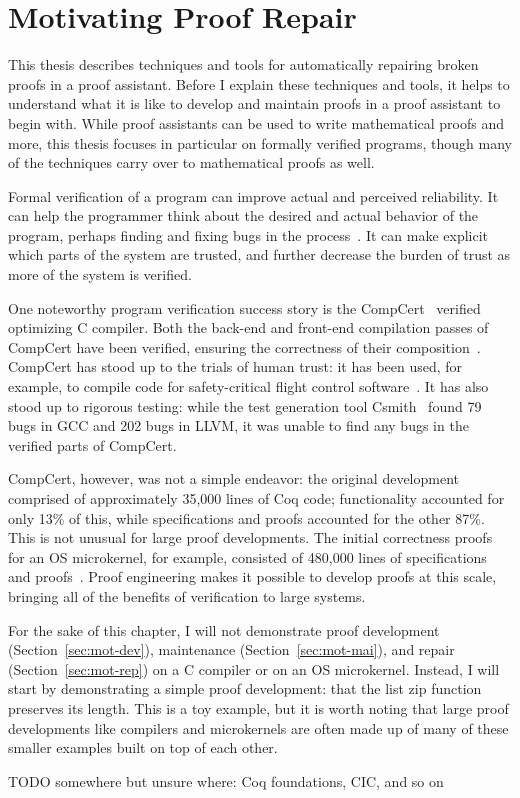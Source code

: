 \chapter{Motivating Proof Repair}

This thesis describes techniques and tools for automatically repairing broken proofs in a proof assistant.
Before I explain these techniques and tools, it helps to understand what it is like to develop and maintain proofs in a proof assistant to begin with.
While proof assistants can be used to write mathematical proofs and more,
this thesis focuses in particular on formally verified programs, though many of the techniques carry over to mathematical proofs as well.

Formal verification of a program can improve actual and perceived reliability.
It can help the programmer think about the desired and actual behavior of the program,
perhaps finding and fixing bugs in the process~\cite{murraybp}.
It can make explicit which parts of the system are trusted, and further decrease the burden
of trust as more of the system is verified.

One noteworthy program verification success story is the CompCert~\cite{Leroy:POPL06, Leroy2009} verified optimizing C compiler.
Both the back-end and front-end compilation passes
of CompCert have been verified, ensuring the correctness of their composition~\cite{Kaestner2017}.
CompCert has stood up to the trials of human trust: it has been used, for example, to compile code for safety-critical flight control software~\cite{Frana2011}.
It has also stood up to rigorous testing: while the test generation tool Csmith~\cite{Yang2011} found 
79 bugs in GCC and 202 bugs in LLVM, it was unable to find any bugs in the verified parts of CompCert.

CompCert, however, was not a simple endeavor: the original development comprised of approximately 35,000 lines of Coq code;
functionality accounted for only 13\% of this, while specifications and proofs accounted for the other 87\%.
This is not unusual for large proof developments. The initial correctness proofs for an OS microkernel,
for example, consisted of 480,000 lines of specifications and proofs~\cite{Klein2014micro}.
Proof engineering makes it possible to develop proofs at this scale,
bringing all of the benefits of verification to large systems.

For the sake of this chapter, I will not demonstrate proof development (Section~\ref{sec:mot-dev}), maintenance (Section~\ref{sec:mot-mai}), and repair (Section~\ref{sec:mot-rep}) on a C compiler or on an OS microkernel.
Instead, I will start by demonstrating a simple proof development: 
that the list zip function preserves its length.
This is a toy example, but it is worth noting that large proof developments like compilers and microkernels
are often made up of many of these smaller examples built on top of each other.

TODO somewhere but unsure where: Coq foundations, CIC, and so on







